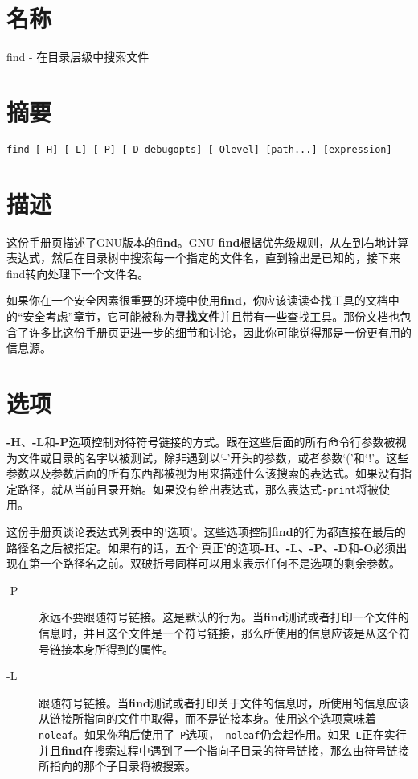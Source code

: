 \documentclass{article}
\begin{document}
\begin{CJK*}{UTF8}{gbsn}
\tableofcontents{}
\section{名称}
find - 在目录层级中搜索文件
\section{摘要}
\verb|find [-H] [-L] [-P] [-D debugopts] [-Olevel] [path...] [expression]|
\section{描述}
这份手册页描述了GNU版本的\textbf{find}。GNU \textbf{find}根据优先级规则，从左到右地计算表达式，然后在目录树中搜索每一个指定的文件名，直到输出是已知的，接下来find转向处理下一个文件名。

如果你在一个安全因素很重要的环境中使用\textbf{find}，你应该读读查找工具的文档中的``安全考虑''章节，它可能被称为\textbf{寻找文件}并且带有一些查找工具。那份文档也包含了许多比这份手册页更进一步的细节和讨论，因此你可能觉得那是一份更有用的信息源。
\section{选项}
\textbf{-H}、\textbf{-L}和\textbf{-P}选项控制对待符号链接的方式。跟在这些后面的所有命令行参数被视为文件或目录的名字以被测试，除非遇到以`-'开头的参数，或者参数`('和`!'。这些参数以及参数后面的所有东西都被视为用来描述什么该搜索的表达式。如果没有指定路径，就从当前目录开始。如果没有给出表达式，那么表达式\verb|-print|将被使用。

这份手册页谈论表达式列表中的`选项'。这些选项控制\textbf{find}的行为都直接在最后的路径名之后被指定。如果有的话，五个`真正'的选项\textbf{-H、-L、-P、-D}和\textbf{-O}必须出现在第一个路径名之前。双破折号同样可以用来表示任何不是选项的剩余参数。
\begin{description}
\item[-P] 永远不要跟随符号链接。这是默认的行为。当\textbf{find}测试或者打印一个文件的信息时，并且这个文件是一个符号链接，那么所使用的信息应该是从这个符号链接本身所得到的属性。
\item[-L] 跟随符号链接。当\textbf{find}测试或者打印关于文件的信息时，所使用的信息应该从链接所指向的文件中取得，而不是链接本身。使用这个选项意味着\verb|-noleaf|。如果你稍后使用了\verb|-P|选项，\verb|-noleaf|仍会起作用。如果\verb|-L|正在实行并且\textbf{find}在搜索过程中遇到了一个指向子目录的符号链接，那么由符号链接所指向的那个子目录将被搜索。


\end{description}
\end{CJK*}
\end{document}
